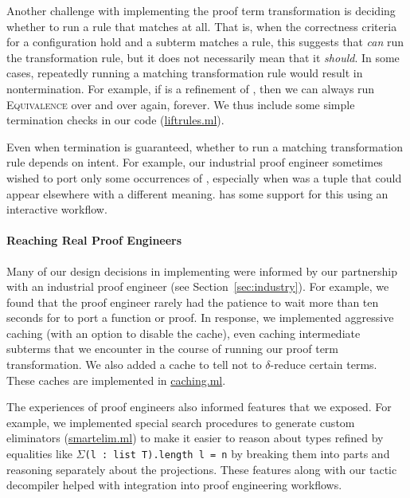 Another challenge with implementing the proof term transformation is deciding whether to run a rule that matches at all.
That is, when the correctness criteria for a configuration hold and a subterm matches a rule, this suggests that \toolname \textit{can}
run the transformation rule, but it does not necessarily mean that it \textit{should}.
In some cases, repeatedly running a matching transformation rule would result in nontermination.
For example, if \B is a refinement of \A, then we can always run \textsc{Equivalence}
over and over again, forever.
We thus include some simple termination checks in our code (\href{https://github.com/uwplse/pumpkin-pi/blob/master/plugin/src/automation/lift/liftrules.ml}{liftrules.ml}).

Even when termination is guaranteed, whether to run a matching transformation rule
depends on intent.
For example, our industrial proof engineer sometimes wished to port only some occurrences of \A,
especially when \A was a tuple that could appear elsewhere
with a different meaning.
\toolname has some support for this using an interactive workflow.

\paragraph{Reaching Real Proof Engineers}
Many of our design decisions in implementing \toolname were informed by our partnership with
an industrial proof engineer (see Section~\ref{sec:industry}).
For example, we found that the proof engineer rarely had the patience to wait more than ten seconds
for \toolname to port a function or proof.
In response, we implemented aggressive caching (with an option to disable the cache), even caching intermediate subterms that
we encounter in the course of running our proof term transformation.
We also added a cache to tell \toolname not to $\delta$-reduce certain terms.
These caches are implemented in \href{https://github.com/uwplse/pumpkin-pi/blob/master/plugin/src/cache/caching.ml}{caching.ml}.

The experiences of proof engineers also informed features that we exposed.
For example, we implemented special search procedures to generate custom eliminators (\href{https://github.com/uwplse/pumpkin-pi/blob/master/plugin/src/automation/search/smartelim.ml}{smartelim.ml}) to make it easier to reason about
types refined by equalities like $\Sigma$\lstinline{(l : list T).length l = n}
by breaking them into parts and reasoning separately about the projections.
These features along with our tactic decompiler helped with integration into proof engineering workflows.

